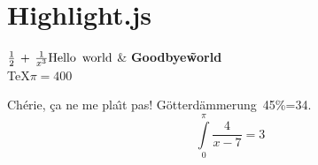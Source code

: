 \documentclass{article}
\newcommand{\eTiX}{\TeX}
\begin{document}
\section*{Highlight.js}
\begin{table}[c|c]
$\frac 12\, + \, \frac 1{x^3}\text{Hello \! world}$ & \textbf{Goodbye\~ world} \\\eTiX $ \pi=400 $
\end{table}
Ch\'erie, \c{c}a ne me pla\^\i t pas! %
G\"otterd\"ammerung~45\%=34.
$$
    \int\limits_{0}^{\pi}\frac{4}{x-7}=3
$$
\end{document}
